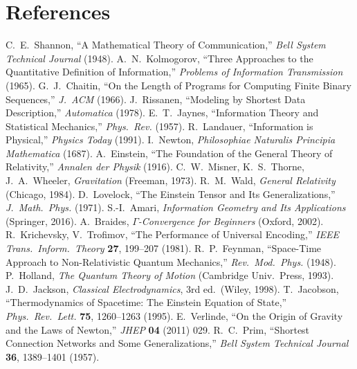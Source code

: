 \documentclass[aps,preprint,onecolumn,longbibliography,nofootinbib]{revtex4-2}
\numberwithin{equation}{section}        %
\begin{document}
\section*{References}
\begin{thebibliography}{99}
 C.~E.~Shannon, ``A Mathematical Theory of Communication,'' \emph{Bell System Technical Journal} (1948).
 A.~N.~Kolmogorov, ``Three Approaches to the Quantitative Definition of Information,'' \emph{Problems of Information Transmission} (1965).
 G.~J.~Chaitin, ``On the Length of Programs for Computing Finite Binary Sequences,'' \emph{J.\ ACM} (1966).
 J.~Rissanen, ``Modeling by Shortest Data Description,'' \emph{Automatica} (1978).
 E.~T.~Jaynes, ``Information Theory and Statistical Mechanics,'' \emph{Phys.\ Rev.} (1957).
 R.~Landauer, ``Information is Physical,'' \emph{Physics Today} (1991).
 I.~Newton, \emph{Philosophiae Naturalis Principia Mathematica} (1687).
 A.~Einstein, ``The Foundation of the General Theory of Relativity,'' \emph{Annalen der Physik} (1916).
 C.~W.~Misner, K.~S.~Thorne, J.~A.~Wheeler, \emph{Gravitation} (Freeman, 1973).
 R.~M.~Wald, \emph{General Relativity} (Chicago, 1984).
 D.~Lovelock, ``The Einstein Tensor and Its Generalizations,'' \emph{J.\ Math.\ Phys.} (1971).
 S.-I.~Amari, \emph{Information Geometry and Its Applications} (Springer, 2016).
 A.~Braides, \emph{$\Gamma$-Convergence for Beginners} (Oxford, 2002).
 R.~Krichevsky, V.~Trofimov, ``The Performance of Universal Encoding,'' \emph{IEEE Trans.\ Inform.\ Theory} \textbf{27}, 199--207 (1981).
 R.~P.~Feynman, ``Space-Time Approach to Non-Relativistic Quantum Mechanics,'' \emph{Rev.\ Mod.\ Phys.} (1948).
 P.~Holland, \emph{The Quantum Theory of Motion} (Cambridge Univ.\ Press, 1993).
 J.~D.~Jackson, \emph{Classical Electrodynamics}, 3rd ed.\ (Wiley, 1998).
 T.~Jacobson, ``Thermodynamics of Spacetime: The Einstein Equation of State,'' \emph{Phys.\ Rev.\ Lett.} \textbf{75}, 1260--1263 (1995).
 E.~Verlinde, ``On the Origin of Gravity and the Laws of Newton,'' \emph{JHEP} \textbf{04} (2011) 029.
 R.~C.~Prim, ``Shortest Connection Networks and Some Generalizations,'' \emph{Bell System Technical Journal} \textbf{36}, 1389--1401 (1957).
\end{thebibliography}
\end{document}
